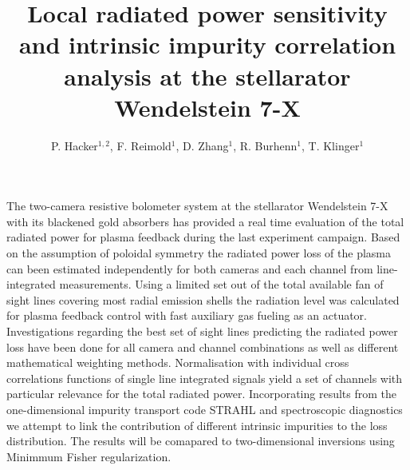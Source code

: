 \documentclass{epsconf}
\title{%
    Local radiated power sensitivity and intrinsic impurity correlation 
    analysis at the stellarator Wendelstein 7-X}%
\author{%
    P. Hacker$^{1,2}$, %
    F. Reimold$^{1}$, %
    D. Zhang$^{1}$, %
    R. Burhenn$^{1}$, %
    T. Klinger$^{1}$%
}%
\institute{
    $^{1}$ Max-Planck Institute for Plasma Physics, Greifswald, Germany\\%
    $^{2}$ Ernst-Moritz-Arndt Universität Greifswald, %
    D-17491 Greifswald, Germany%
}%
\begin{document}
\maketitle

The two-camera resistive bolometer system at the stellarator Wendelstein 7-X with its blackened gold absorbers has provided a real time evaluation of the total radiated power for plasma feedback during the last experiment campaign. Based on the assumption of poloidal symmetry the radiated power loss of the plasma can been estimated independently for both cameras and each channel from line-integrated measurements. Using a limited set out of the total available fan of sight lines covering most radial emission shells the radiation level was calculated for plasma feedback control with fast auxiliary gas fueling as an actuator. Investigations regarding the best set of sight lines predicting the radiated power loss have been done for all camera and channel combinations as well as different mathematical weighting methods. Normalisation with individual cross correlations functions of single line integrated signals yield a set of channels with particular relevance for the total radiated power. Incorporating results from the one-dimensional impurity transport code STRAHL and spectroscopic diagnostics we attempt to link the contribution of different intrinsic impurities to the loss distribution. The results will be comapared to two-dimensional inversions using Minimmum Fisher regularization.
\end{document}
